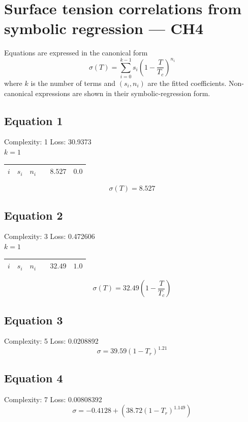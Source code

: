 \documentclass[11pt]{article}
\begin{document}
\section*{Surface tension correlations from symbolic regression — CH4}
\noindent Equations are expressed in the canonical form
\[
  \sigma(T) = \sum_{i=0}^{k-1} s_i \left(1 - \frac{T}{T_c}\right)^{\!n_i}
\]
where $k$ is the number of terms and $(s_i, n_i)$ are the fitted coefficients.
Non-canonical expressions are shown in their symbolic-regression form.

\subsection*{Equation 1}
\noindent Complexity: 1 \quad Loss: 30.9373 \\[4pt]
\noindent $k = 1$ \\[2pt]
\begin{center}
\begin{tabular}{ccc}
\toprule
$i$ & $s_i$ & $n_i$ \
 & $8.527$ & $0.0$ \\
\bottomrule
\end{tabular}
\end{center}
\[
\sigma(T) = 8.527
\]

\subsection*{Equation 2}
\noindent Complexity: 3 \quad Loss: 0.472606 \\[4pt]
\noindent $k = 1$ \\[2pt]
\begin{center}
\begin{tabular}{ccc}
\toprule
$i$ & $s_i$ & $n_i$ \
 & $32.49$ & $1.0$ \\
\bottomrule
\end{tabular}
\end{center}
\[
\sigma(T) = 32.49 \left(1 - \dfrac{T}{T_{\!c}}\right)
\]

\subsection*{Equation 3}
\noindent Complexity: 5 \quad Loss: 0.0208892 \\[4pt]
\[
\sigma = 39.59 \left(1 - T_r\right)^{1.21}
\]

\subsection*{Equation 4}
\noindent Complexity: 7 \quad Loss: 0.00808392 \\[4pt]
\[
\sigma = -0.4128 + (38.72 \left(1 - T_r\right)^{1.149})
\]
\end{document}

